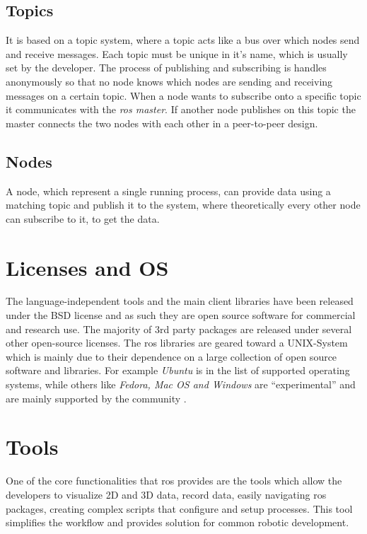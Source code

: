 \subsection{Topics}
It is based on a topic system, where a topic acts like a bus over which nodes send and receive messages. Each topic must be unique in it's name, which is usually set by the developer. The process of publishing and subscribing is handles anonymously so that no node knows which nodes are sending and receiving messages on a certain topic. When a node wants to subscribe onto a specific topic it communicates with the \textit{\gls{ros} master}. If another node publishes on this topic the master connects the two nodes with each other in a peer-to-peer design.

\subsection{Nodes}
A node, which represent a single running process, can provide data using a matching topic and publish it to the system, where theoretically every other node can subscribe to it, to get the data. 

\section{Licenses and OS}
The language-independent tools and the main client libraries have been released under the BSD license and as such they are open source software for commercial and research use. The majority of 3rd party packages are released under several other open-source licenses.\newline
The \gls{ros} libraries are geared toward a UNIX-System which is mainly due to their dependence on a large collection of open source software and libraries.
For example \textit{Ubuntu} is in the list of supported operating systems, while others like \textit{Fedora, Mac OS and Windows} are \enquote{experimental} and are mainly supported by the community \cite{isrosforme}.

\section{Tools}
One of the core functionalities that \gls{ros} provides are the tools which allow the developers to visualize 2D and 3D data, record data, easily navigating \gls{ros} packages, creating complex scripts that configure and setup processes. This tool simplifies the workflow and provides solution for common robotic development.


